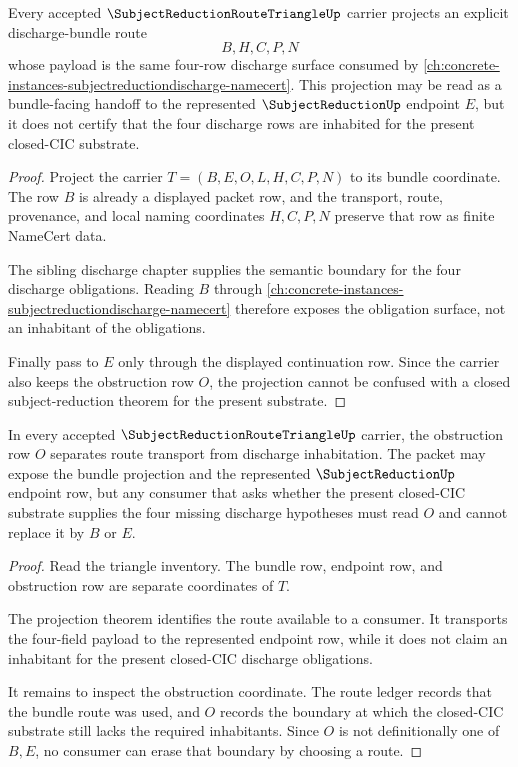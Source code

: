 \begin{theorem}
\label{thm:subject-reduction-route-triangle-bundle-projection}
Every accepted $\SubjectReductionRouteTriangleUp$ carrier projects an explicit
discharge-bundle route
$$
B,H,C,P,N
$$
whose payload is the same four-row discharge surface consumed by
\autoref{ch:concrete-instances-subjectreductiondischarge-namecert}. This
projection may be read as a bundle-facing handoff to the represented
$\SubjectReductionUp$ endpoint $E$, but it does not certify that the four
discharge rows are inhabited for the present closed-CIC substrate.
\end{theorem}
\begin{proof}
Project the carrier $T=(B,E,O,L,H,C,P,N)$ to its bundle coordinate. The row
$B$ is already a displayed packet row, and the transport, route, provenance,
and local naming coordinates $H,C,P,N$ preserve that row as finite NameCert
data.

The sibling discharge chapter supplies the semantic boundary for the four
discharge obligations. Reading $B$ through
\autoref{ch:concrete-instances-subjectreductiondischarge-namecert} therefore
exposes the obligation surface, not an inhabitant of the obligations.

Finally pass to $E$ only through the displayed continuation row. Since the
carrier also keeps the obstruction row $O$, the projection cannot be confused
with a closed subject-reduction theorem for the present substrate.
\end{proof}

\begin{theorem}
\label{thm:subject-reduction-route-triangle-obstruction-boundary}
In every accepted $\SubjectReductionRouteTriangleUp$ carrier, the obstruction
row $O$ separates route transport from discharge inhabitation. The packet may
expose the bundle projection and the represented $\SubjectReductionUp$
endpoint row, but any consumer that asks whether the present closed-CIC
substrate supplies the four missing discharge hypotheses must read $O$ and
cannot replace it by $B$ or $E$.
\end{theorem}
\begin{proof}
Read the triangle inventory. The bundle row, endpoint row, and obstruction row
are separate coordinates of $T$.

The projection theorem identifies the route available to a consumer. It
transports the four-field payload to the represented endpoint row, while it
does not claim an inhabitant for the present closed-CIC discharge obligations.

It remains to inspect the obstruction coordinate. The route ledger records
that the bundle route was used, and $O$ records the boundary at which the
closed-CIC substrate still lacks the required inhabitants. Since $O$ is not
definitionally one of $B,E$, no consumer can erase that boundary by choosing a
route.
\end{proof}

